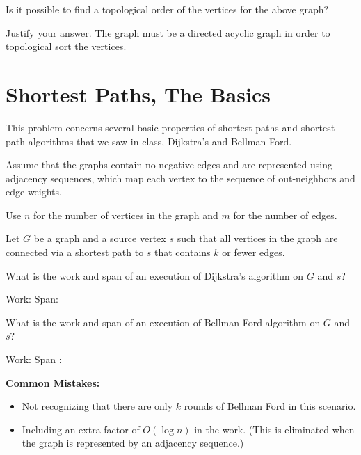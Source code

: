 \begin{problem}[4]

\asktf Is it possible to find a topological order of the vertices
for the above graph?

\solf


\ask 
Justify your answer.
\sol
The graph must be a directed acyclic graph in order to
topological sort the vertices.

\end{problem}



\section{Shortest Paths, The Basics}

This problem concerns several basic properties of shortest paths and
shortest path algorithms that we saw in class, Dijkstra's and
Bellman-Ford.

\begin{assumption}
Assume that the graphs contain no negative edges and are
represented using adjacency sequences,  which map each
vertex to the sequence of out-neighbors and edge weights.

Use $n$ for the number of vertices in the graph and $m$ for the number
of edges.
\end{assumption}



\begin{problem}

Let $G$ be a graph and a source vertex $s$ such that all vertices in
the graph are connected via a shortest path to $s$ that contains $k$
or fewer edges.

\ask
What is the work and span of an execution of Dijkstra's algorithm on
$G$ and $s$?

\sols 
Work: 
Span: 

\ask
What is the work and span of an execution of Bellman-Ford algorithm on
$G$ and $s$?

\sols
Work: 
Span :  

\notes
\textbf{Common Mistakes:}
\begin{itemize}
	\item Not recognizing that there are only $k$ rounds of Bellman Ford in this
  scenario.

	\item Including an extra factor of $O(\log n)$ in the work. (This is
  eliminated when the graph is represented by an adjacency sequence.)
\end{itemize}
\end{problem}

